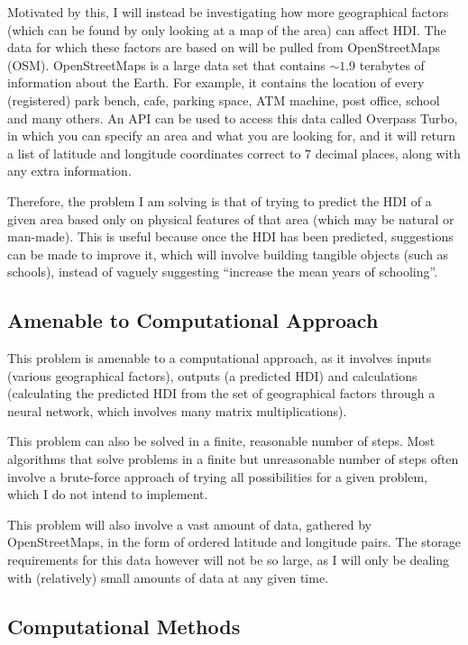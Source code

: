 \documentclass[12pt]{report}
\begin{document}
Motivated by this, I will instead be investigating how more geographical factors (which can be found by only looking at a map of the area) can affect HDI. The data for which these factors are based on will be pulled from OpenStreetMaps (OSM). OpenStreetMaps is a large data set that contains $\sim 1.9$ terabytes of information about the Earth. For example, it contains the location of every (registered) park bench, cafe, parking space, ATM machine, post office, school and many others. An API can be used to access this data called Overpass Turbo, in which you can specify an area and what you are looking for, and it will return a list of latitude and longitude coordinates correct to 7 decimal places, along with any extra information.

Therefore, the problem I am solving is that of trying to predict the HDI of a given area based only on physical features of that area (which may be natural or man-made). This is useful because once the HDI has been predicted, suggestions can be made to improve it, which will involve building tangible objects (such as schools), instead of vaguely suggesting ``increase the mean years of schooling''.

\subsection{Amenable to Computational Approach}
This problem is amenable to a computational approach, as it involves inputs (various geographical factors), outputs (a predicted HDI) and calculations (calculating the predicted HDI from the set of geographical factors through a neural network, which involves many matrix multiplications).

This problem can also be solved in a finite, reasonable number of steps. Most algorithms that solve problems in a finite but unreasonable number of steps often involve a brute-force approach of trying all possibilities for a given problem, which I do not intend to implement.

This problem will also involve a vast amount of data, gathered by OpenStreetMaps, in the form of ordered latitude and longitude pairs. The storage requirements for this data however will not be so large, as I will only be dealing with (relatively) small amounts of data at any given time.

\subsection{Computational Methods}
\end{document}
